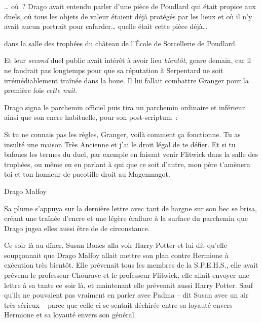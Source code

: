 … où~? Drago avait entendu parler d'une pièce de Poudlard qui était propice aux duels, où tous les objets de valeur étaient déjà protégés par les lieux et où il n'y avait aucun portrait pour cafarder… quelle était cette pièce déjà…

\begin{writtenNote}
dans la salle des trophées du château de l'École de Sorcellerie de Poudlard. \end{writtenNote}

Et leur \emph{second} duel public avait intérêt à avoir lieu \emph{bientôt}, genre demain, car il ne faudrait pas longtemps pour que sa réputation à Serpentard ne soit irrémédiablement traînée dans la boue. Il lui fallait combattre Granger pour la première fois \emph{cette nuit}.

\begin{writtenNote}
Au dernier coup de minuit qui mettra fin à ce jour même.

{Drago, de la Noble et Très Ancienne maison Malfoy.
\end{writtenNote}

Drago signa le parchemin officiel puis tira un parchemin ordinaire et inférieur ainsi que son encre habituelle, pour son post-scriptum~:

\begin{writtenNote}Si tu ne connais pas les règles, Granger, voilà comment ça fonctionne. Tu as insulté une maison Très Ancienne et j'ai le droit légal de te défier. Et si tu bafoues les termes du duel, par exemple en faisant venir Flitwick dans la salle des trophées, ou même en en parlant à qui que ce soit d'autre, mon père t'amènera toi et ton honneur de pacotille droit au Magenmagot.

Drago Malfoy
\end{writtenNote}

Sa plume s'appuya sur la dernière lettre avec tant de hargne sur son bec se brisa, créant une traînée d'encre et une légère éraflure à la surface du parchemin que Drago jugea elles aussi être de de circonstance.

\later

Ce soir là au dîner, Susan Bones alla voir Harry Potter et lui dit qu'elle soupçonnait que Drago Malfoy allait mettre son plan contre Hermione à exécution très bientôt. Elle prévenait tous les membres de la S.P.E.H.S., elle avait prévenu le professeur Chourave et le professeur Flitwick, elle allait envoyer une lettre à sa tante ce soir là, et maintenant elle prévenait aussi Harry Potter. Sauf qu'ils ne pouvaient pas vraiment en parler avec Padma -- dit Susan avec un air très sérieux -- parce que celle-ci se sentait déchirée entre sa loyauté envers Hermione et sa loyauté envers son général.

